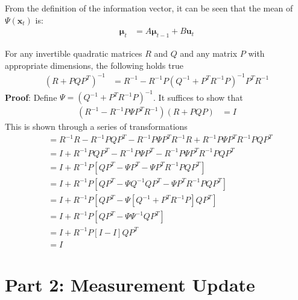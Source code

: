 From the definition of the information vector, it can be seen that the mean of $\Psi(\pmb{x}_t)$ is:
\begin{align}
\pmb{\mu}_{t} &= A \pmb{\mu}_{t-1} + B \pmb{u}_{t} 
\end{align}


\begin{theo} \label{theorem:woodbury}
For any invertible quadratic matrices $R$ and $Q$ and any matrix $P$ with appropriate dimensions, the following holds true
\begin{align*}
(R + P Q P^{T} )^{-1} &= R^{-1} - R^{-1} P (Q^{-1} + P^{T} R^{-1} P)^{-1} P^{T} R^{-1}
\end{align*}
\noindent \textbf{Proof}: Define $\Psi = (Q^{-1} + P^{T} R^{-1} P )^{-1}$. It suffices to show that
\begin{align*}
(R^{-1} - R^{-1} P \Psi P^{T} R^{-1})(R + P Q P) &= I 
\end{align*}
This is shown through a series of transformations
\begin{align*}
&= R^{-1} R - R^{-1} P Q P^{T} - R^{-1} P \Psi P^{T} R^{-1} R + R^{-1} P \Psi P^{T} R^{-1} P Q P^{T}  \\ 
&= I + R^{-1} P Q P^{T} - R^{-1} P \Psi P^{T} - R^{-1} P \Psi P^{T} R^{-1} P Q P^{T}  \\
&= I + R^{-1} P \left[ Q P^{T} - \Psi P^{T} - \Psi P^{T} R^{-1} P Q P^{T} \right]  \\
&= I + R^{-1} P \left[ Q P^{T} - \Psi Q^{-1} Q P^{T} - \Psi P^{T} R^{-1} P Q P^{T} \right]  \\
&= I + R^{-1} P \left[ Q P^{T} - \Psi \left[ Q^{-1} + P^{T} R^{-1} P \right] Q P^{T} \right]  \\
&= I + R^{-1} P \left[ Q P^{T} - \Psi \Psi^{-1} Q P^{T} \right] \\
&= I + R^{-1} P \left[ I - I \right] Q P^{T}  \\
&= I \nonumber
\end{align*}
\end{theo}

\section{Part 2: Measurement Update}
\label{section:prediction}


